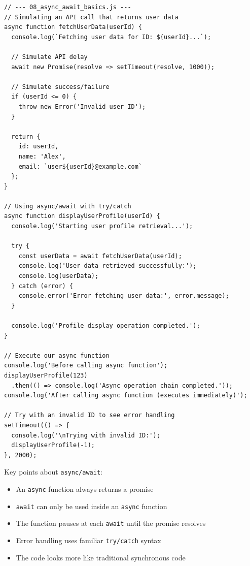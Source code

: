 \documentclass[12pt,letterpaper]{article}
\newenvironment{macterminal}{%
    \begin{mdframed}[
        linecolor=terminalFrame,
        backgroundcolor=terminalBg,
        roundcorner=5pt,
        skipabove=5pt,
        skipbelow=5pt,
        linewidth=1pt,
        innertopmargin=5pt,
        frametitle={%
            \tikz[baseline=(current bounding box.east), outer sep=0pt]{
                \fill[red!80!black] (0,0) circle (5pt);
                \fill[yellow!80!black] (0.7,0) circle (5pt);
                \fill[green!70!black] (1.4,0) circle (5pt);
            }
        },
        frametitlealignment=\raggedright,
        frametitleaboveskip=8pt,
        frametitlebelowskip=0pt,
    ]
}{%
    \end{mdframed}%
}
\begin{document}
\begin{macterminal}
\begin{lstlisting}
// --- 08_async_await_basics.js ---
// Simulating an API call that returns user data
async function fetchUserData(userId) {
  console.log(`Fetching user data for ID: ${userId}...`);
  
  // Simulate API delay
  await new Promise(resolve => setTimeout(resolve, 1000));
  
  // Simulate success/failure
  if (userId <= 0) {
    throw new Error('Invalid user ID');
  }
  
  return {
    id: userId,
    name: 'Alex',
    email: `user${userId}@example.com`
  };
}

// Using async/await with try/catch
async function displayUserProfile(userId) {
  console.log('Starting user profile retrieval...');
  
  try {
    const userData = await fetchUserData(userId);
    console.log('User data retrieved successfully:');
    console.log(userData);
  } catch (error) {
    console.error('Error fetching user data:', error.message);
  }
  
  console.log('Profile display operation completed.');
}

// Execute our async function
console.log('Before calling async function');
displayUserProfile(123)
  .then(() => console.log('Async operation chain completed.'));
console.log('After calling async function (executes immediately)');

// Try with an invalid ID to see error handling
setTimeout(() => {
  console.log('\nTrying with invalid ID:');
  displayUserProfile(-1);
}, 2000);
\end{lstlisting}
\end{macterminal}

Key points about \texttt{\textcolor{accentColor}{async/await}}:
\begin{itemize}
    \item An \texttt{\textcolor{accentColor}{async}} function always returns a promise
    \item \texttt{\textcolor{accentColor}{await}} can only be used inside an \texttt{\textcolor{accentColor}{async}} function
    \item The function pauses at each \texttt{\textcolor{accentColor}{await}} until the promise resolves
    \item Error handling uses familiar \texttt{\textcolor{accentColor}{try/catch}} syntax
    \item The code looks more like traditional synchronous code
\end{itemize}
\end{document}
